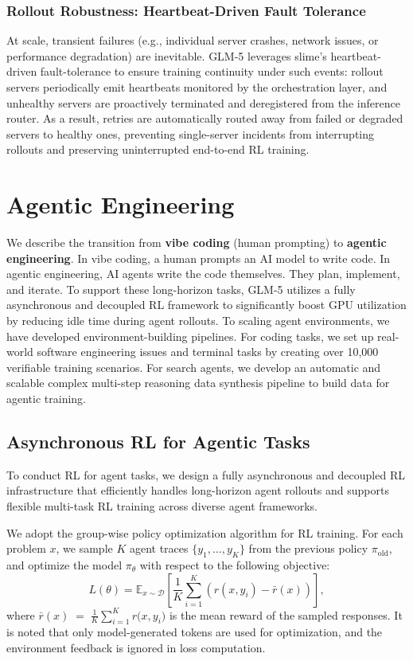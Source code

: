 \documentclass{article}
\theoremstyle{definition}
\begin{document}
\subsubsection{Rollout Robustness: Heartbeat-Driven Fault Tolerance}

At scale, transient failures (e.g., individual server crashes, network issues, or performance degradation) are inevitable. GLM-5 leverages slime's heartbeat-driven fault-tolerance to ensure training continuity under such events: rollout servers periodically emit heartbeats monitored by the orchestration layer, and unhealthy servers are proactively terminated and deregistered from the inference router. As a result, retries are automatically routed away from failed or degraded servers to healthy ones, preventing single-server incidents from interrupting rollouts and preserving uninterrupted end-to-end RL training.

\section{Agentic Engineering}
We describe the transition from \textbf{vibe coding} (human prompting) to \textbf{agentic engineering}.
In vibe coding, a human prompts an AI model to write code. In agentic engineering, AI agents write the code themselves. They plan, implement, and iterate. 
To support these long-horizon tasks, GLM-5 utilizes a fully asynchronous and decoupled RL framework to significantly boost GPU utilization by reducing idle time during agent rollouts. 
To scaling agent environments, we have developed environment-building pipelines. For coding tasks, we set up real-world  software engineering issues and terminal tasks by creating over 10,000 verifiable training scenarios. For search agents, we develop an automatic and scalable complex multi-step reasoning data synthesis pipeline to build data for agentic training.

\subsection{Asynchronous RL for Agentic Tasks}
To conduct RL for agent tasks, we design a fully asynchronous and decoupled RL infrastructure that efficiently handles long-horizon agent rollouts and supports flexible multi-task RL training across diverse agent frameworks.

We adopt the group-wise policy optimization algorithm for RL training.
For each problem \(x\), we sample \(K\) agent traces \(\{y_1,\dots,y_K\}\) from the previous policy
\(\pi_{\text{old}}\), and optimize the model \(\pi_\theta\) with respect to the following objective:
\[
L(\theta)
   = \mathbb{E}_{x\sim\mathcal{D}}\!\left[
        \frac{1}{K}\sum_{i=1}^{K}
        \left(
            r(x,y_i) - \bar{r}(x)
        \right)
     \right],
\]
where $\bar{r}(x) \;=\; \frac{1}{K}\sum_{i=1}^{K} r\bigl(x,y_i\bigr)$
is the mean reward of the sampled responses. It is noted that only model-generated tokens are used for optimization, and the environment feedback is ignored in loss computation. 
\end{document}
